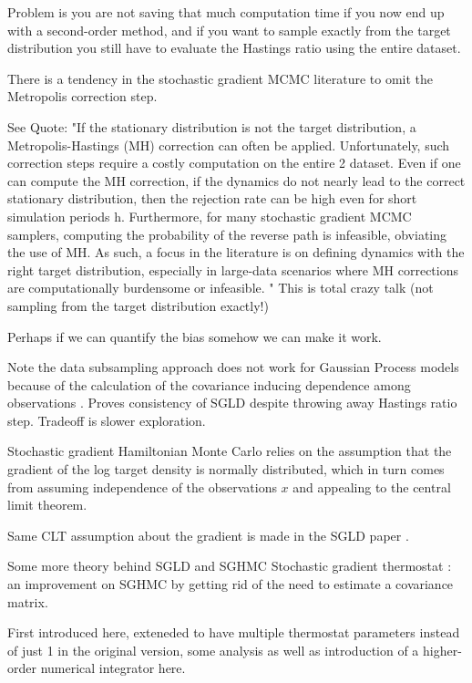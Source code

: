 \documentclass{book}
\begin{document}
\begin{enumerate}
\cite{chen2014stochastic}

Problem is you are not saving that much computation time if you now end up with a second-order method, and if you want to sample exactly from the target distribution you still have to evaluate the Hastings ratio using the entire dataset.

There is a tendency in the stochastic gradient MCMC literature to omit the Metropolis correction step.

See \cite{ding2014bayesian} 
Quote: "If the stationary distribution is not the target distribution, a Metropolis-Hastings (MH) correction can often be applied. Unfortunately, such correction steps require a costly computation on the entire
2
dataset. Even if one can compute the MH correction, if the dynamics do not nearly lead to the correct stationary distribution, then the rejection rate can be high even for short simulation periods h. Furthermore, for many stochastic gradient MCMC samplers, computing the probability of the reverse path is infeasible, obviating the use of MH. As such, a focus in the literature is on defining dynamics with the right target distribution, especially in large-data scenarios where MH corrections are computationally burdensome or infeasible.
"
\cite{ma2015complete}
This is total crazy talk (not sampling from the target distribution exactly!)

Perhaps if we can quantify the bias somehow we can make it work.

Note the data subsampling approach does not work for Gaussian Process models because of the calculation of the covariance inducing dependence among observations \cite{filippone2015enabling}.
\cite{teh2014consistency}
Proves consistency of SGLD despite throwing away Hastings ratio step. Tradeoff is slower exploration.

Stochastic gradient Hamiltonian Monte Carlo \cite{chen2014stochastic}
relies on the assumption that the gradient of the log target density is normally distributed, which in turn comes from assuming independence of the observations $x$ and appealing to the central limit theorem.

Same CLT assumption about the gradient is made in
the SGLD paper \cite{welling2011bayesian}.

Some more theory behind SGLD and SGHMC \cite{ma2015complete}
Stochastic gradient thermostat : an improvement on SGHMC by getting rid of the need to estimate a covariance matrix. 

First introduced here\cite{ding2014bayesian}, exteneded\cite{gan2015scalable} to have multiple thermostat parameters instead of just 1 in the original version, some analysis as well as introduction of a higher-order numerical integrator here\cite{li2015high,chen2015convergence}.


\end{enumerate}
\end{document}
